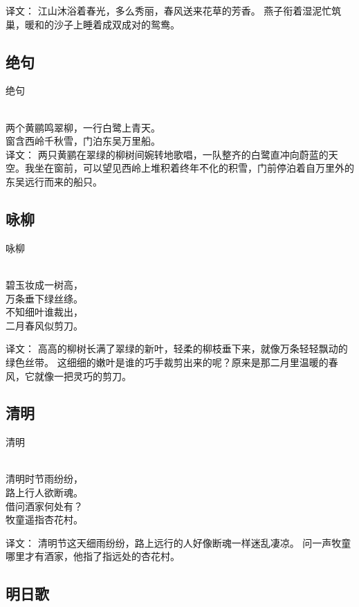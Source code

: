 译文：
江山沐浴着春光，多么秀丽，春风送来花草的芳香。
燕子衔着湿泥忙筑巢，暖和的沙子上睡着成双成对的鸳鸯。

\subsection{绝句}

\noindent 绝句

  \\

\noindent 两个黄鹂鸣翠柳，一行白鹭上青天。\\
窗含西岭千秋雪，门泊东吴万里船。\\

译文：
两只黄鹂在翠绿的柳树间婉转地歌唱，一队整齐的白鹭直冲向蔚蓝的天空。我坐在窗前，可以望见西岭上堆积着终年不化的积雪，门前停泊着自万里外的东吴远行而来的船只。

\subsection{咏柳}

\noindent 咏柳

  \\

\noindent 碧玉妆成一树高，\\万条垂下绿丝绦。\\
不知细叶谁裁出，\\二月春风似剪刀。

译文：
高高的柳树长满了翠绿的新叶，轻柔的柳枝垂下来，就像万条轻轻飘动的绿色丝带。
这细细的嫩叶是谁的巧手裁剪出来的呢？原来是那二月里温暖的春风，它就像一把灵巧的剪刀。

\subsection{清明}

\noindent 清明

  \\

\noindent 清明时节雨纷纷，\\路上行人欲断魂。\\
借问酒家何处有？\\牧童遥指杏花村。

译文：
清明节这天细雨纷纷，路上远行的人好像断魂一样迷乱凄凉。
问一声牧童哪里才有酒家，他指了指远处的杏花村。

\subsection{明日歌}

